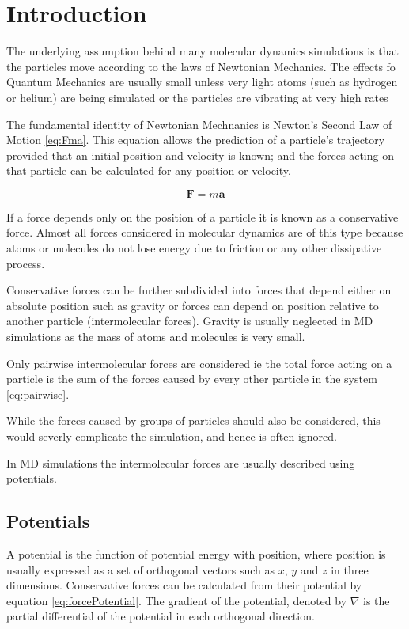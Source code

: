 \documentclass[12pt]{UoAthesis}
\begin{document}
\section{Introduction}
The underlying assumption behind many molecular dynamics simulations
is that the particles move according to the laws of Newtonian
Mechanics.  The effects fo Quantum Mechanics are usually small unless
very light atoms (such as hydrogen or helium) are being simulated or
the particles are vibrating at very high rates \cite{Frenkel2002}

The fundamental identity of Newtonian Mechnanics is Newton's Second
Law of Motion \eqref{eq:Fma}. This equation allows the prediction of a
particle's trajectory provided that an initial position and velocity
is known; and the forces acting on that particle can be calculated for
any position or velocity.

\begin{equation}
  \mathbf{F} = m \mathbf{a} \label{eq:Fma}
\end{equation}

If a force depends only on the position of a particle it is known as a
conservative force.  Almost all forces considered in molecular
dynamics are of this type because atoms or molecules do not lose
energy due to friction or any other dissipative process.  

Conservative forces can be further subdivided into forces that depend
either on absolute position such as gravity or forces can depend on
position relative to another particle (intermolecular forces).
Gravity is usually neglected in MD simulations as the mass of atoms
and molecules is very small.

Only pairwise intermolecular forces are considered ie the total force
acting on a particle is the sum of the forces caused by every other
particle in the system \eqref{eq:pairwise}.


While the forces caused by groups of particles should also be
considered, this would severly complicate the simulation, and hence is
often ignored.

In MD simulations the intermolecular forces are usually described using potentials.

\subsection{Potentials}
A potential is the function of potential energy with position, where
position is usually expressed as a set of orthogonal vectors such as
$x$, $y$ and $z$ in three dimensions. Conservative forces can be
calculated from their potential by equation
\ref{eq:forcePotential}. The gradient of the potential, denoted by
$\nabla$ is the partial differential of the potential in each
orthogonal direction.
\end{document}
